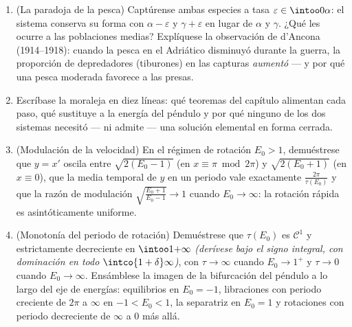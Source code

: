 \begin{problem}
\begin{enumerate}[resume]
        sea cual sea la amplitud \emph{(intégrese $(\ln x)' =
        \alpha - \beta y$ sobre un periodo)}. \item (La paradoja de la
        pesca) Captúrense ambas especies a tasa
        $\varepsilon \in \intoo0\alpha$: el sistema conserva su forma
        con $\alpha - \varepsilon$ y $\gamma +
        \varepsilon$ en lugar de $\alpha$ y $\gamma$. ¿Qué les ocurre a
        las poblaciones medias? Explíquese la observación de d'Ancona
        (1914--1918): cuando la pesca en el Adriático disminuyó durante
        la guerra, la proporción de depredadores (tiburones) en las
        capturas \emph{aumentó} --- y por qué una pesca moderada
        favorece a las presas. \item Escríbase la moraleja en diez
        líneas: qué teoremas del capítulo alimentan cada paso, qué
        sustituye a la energía del péndulo y por qué ninguno de los dos
        sistemas necesitó --- ni admite --- una solución elemental en
        forma cerrada.

  \item (Modulación de la velocidad) En el régimen de rotación
  $E_0 > 1$, demuéstrese que $y = x'$ oscila entre $\sqrt{2(E_0 - 1)}$
  (en $x \equiv \pi \bmod 2\pi$) y $\sqrt{2(E_0 + 1)}$ (en
  $x \equiv 0$), que la media temporal de $y$ en un periodo vale
  exactamente $\frac{2\pi}{\tau(E_0)}$ y que la razón de modulación
  $\sqrt{\frac{E_0 + 1}{E_0 - 1}} \to 1$ cuando $E_0
        \to \infty$: la rotación rápida es asintóticamente uniforme.
  \item (Monotonía del periodo de rotación) Demuéstrese que $\tau(E_0)$
  es $\mathcal C^1$ y estrictamente decreciente en $\intoo1{+\infty}$
  \emph{(derívese bajo el signo integral, con dominación en todo
  $\intco{1 + \delta}\infty$)}, con $\tau \to \infty$ cuando
  $E_0 \to 1^+$ y $\tau
        \to 0$ cuando $E_0 \to \infty$. Ensámblese la imagen  de
  la bifurcación del péndulo a lo largo del eje de energías: equilibrios
  en $E_0 = -1$, libraciones con periodo creciente de $2\pi$ a $\infty$
  en $-1 < E_0 < 1$, la separatriz en $E_0 = 1$ y rotaciones con periodo
  decreciente de $\infty$ a $0$ más allá.
\end{enumerate}
\end{problem}
